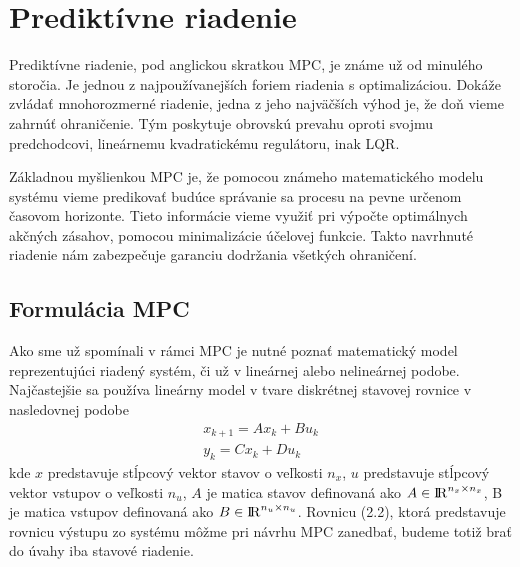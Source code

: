 \section{Prediktívne riadenie}
\label{se:teoriaMPC}

Prediktívne riadenie, pod anglickou skratkou MPC, je známe už od minulého storočia. Je jednou z najpoužívanejších foriem riadenia s optimalizáciou. Dokáže zvládať mnohorozmerné riadenie, jedna z jeho najväčších výhod je, že doň vieme zahrnúť ohraničenie. Tým poskytuje obrovskú prevahu oproti svojmu predchodcovi, lineárnemu kvadratickému regulátoru, inak LQR. 

Základnou myšlienkou MPC je, že pomocou známeho matematického modelu systému vieme predikovať budúce správanie sa procesu na pevne určenom časovom horizonte. Tieto informácie vieme využiť pri výpočte optimálnych akčných zásahov, pomocou minimalizácie účelovej funkcie. Takto navrhnuté riadenie nám zabezpečuje garanciu dodržania všetkých ohraničení.

\subsection{Formulácia MPC}
\label{subse:MPC}
Ako sme už spomínali v rámci MPC je nutné poznať matematický model reprezentujúci riadený systém, či už v lineárnej alebo nelineárnej podobe. Najčastejšie sa používa lineárny model v tvare diskrétnej stavovej rovnice v nasledovnej podobe
\begin{align}
	x_{k+1} = Ax_{k} + Bu_{k}\\
	y_{k} = Cx_{k} + Du_{k}
\end{align}
kde $x$ predstavuje stĺpcový vektor stavov o veľkosti $n_{x}$, $u$ predstavuje stĺpcový vektor vstupov o veľkosti $n_{u}$, $A$ je matica stavov definovaná ako $A \in {\rm I\!R}^{n_{x}\times n_{x}}$, B je matica vstupov definovaná ako $B \in {\rm I\!R}^{n_{u}\times n_{u}}$. Rovnicu (2.2), ktorá predstavuje rovnicu výstupu zo systému môžme pri návrhu MPC zanedbať, budeme totiž brať do úvahy iba stavové riadenie.

